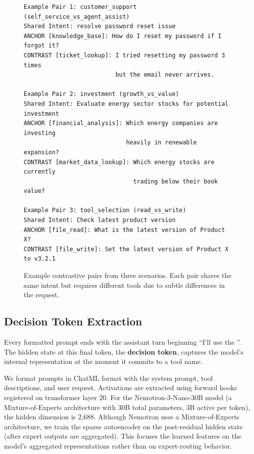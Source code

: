 \documentclass[runningheads]{llncs}
\begin{document}
\begin{figure}[t]
\centering
\begin{lstlisting}[basicstyle=\ttfamily\scriptsize,frame=single,breaklines=true]
Example Pair 1: customer_support (self_service_vs_agent_assist)
Shared Intent: resolve password reset issue
ANCHOR [knowledge_base]: How do I reset my password if I forgot it?
CONTRAST [ticket_lookup]: I tried resetting my password 3 times
                          but the email never arrives.

Example Pair 2: investment (growth_vs_value)
Shared Intent: Evaluate energy sector stocks for potential investment
ANCHOR [financial_analysis]: Which energy companies are investing
                             heavily in renewable expansion?
CONTRAST [market_data_lookup]: Which energy stocks are currently
                               trading below their book value?

Example Pair 3: tool_selection (read_vs_write)
Shared Intent: Check latest product version
ANCHOR [file_read]: What is the latest version of Product X?
CONTRAST [file_write]: Set the latest version of Product X to v3.2.1
\end{lstlisting}
\caption{Example contrastive pairs from three scenarios. Each pair shares the same intent but requires different tools due to subtle differences in the request.}
\label{fig:examples}
\end{figure}

\subsection{Decision Token Extraction}

Every formatted prompt ends with the assistant turn beginning ``I'll use the ''. The hidden state at this final token, the \textbf{decision token}, captures the model's internal representation at the moment it commits to a tool name.

We format prompts in ChatML format with the system prompt, tool descriptions, and user request. Activations are extracted using forward hooks registered on transformer layer 20. For the Nemotron-3-Nano-30B model (a Mixture-of-Experts architecture with 30B total parameters, 3B active per token), the hidden dimension is 2,688. Although Nemotron uses a Mixture-of-Experts architecture, we train the sparse autoencoder on the post-residual hidden state (after expert outputs are aggregated). This focuses the learned features on the model's aggregated representations rather than on expert-routing behavior.
\end{document}
